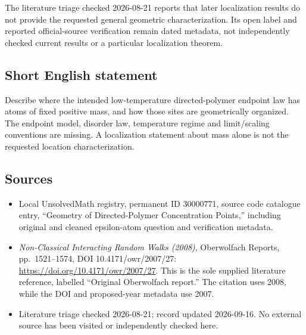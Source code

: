 \documentclass[11pt]{article}
\begin{document}
The literature triage checked 2026-08-21 reports that later localization results do not provide the requested general geometric characterization. Its open label and reported official-source verification remain dated metadata, not independently checked current results or a particular localization theorem.
\subsection{Short English statement}
Describe where the intended low-temperature directed-polymer endpoint law has atoms of fixed positive mass, and how those sites are geometrically organized. The endpoint model, disorder law, temperature regime and limit/scaling conventions are missing. A localization statement about mass alone is not the requested location characterization.
\subsection{Sources}
\begin{itemize}
\item Local UnsolvedMath registry, permanent ID 30000771, source code catalogue entry, ``Geometry of Directed-Polymer Concentration Points,'' including original and cleaned epsilon-atom question and verification metadata.
\item \emph{Non-Classical Interacting Random Walks (2008)}, Oberwolfach Reports, pp.\ 1521--1574, DOI 10.4171/owr/2007/27: \url{https://doi.org/10.4171/owr/2007/27}. This is the sole supplied literature reference, labelled ``Original Oberwolfach report.'' The citation uses 2008, while the DOI and proposed-year metadata use 2007.
\item Literature triage checked 2026-08-21; record updated 2026-09-16. No external source has been visited or independently checked here.
\end{itemize}
\end{document}
